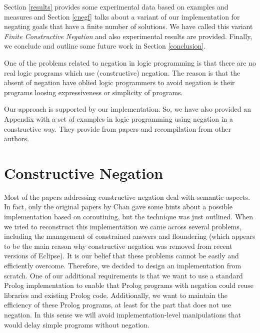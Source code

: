 \documentclass{tlp}
\begin{document}
Section \ref{results} provides some experimental data based on examples and
measures and Section \ref{cnegf} talks about a variant of our implementation
for negating goals that have a finite number of solutions. We have called this
variant \emph{Finite Constructive Negation} and also experimental results are
provided. Finally, we conclude and outline some future work in Section
\ref{conclusion}.
 
One of the problems related to negation in logic programming is that there are
no real logic programs which use (constructive) negation. The reason is that
the absent of negation have oblied logic programmers to avoid negation is
their programs loosing expressiveness or simplicity of programs.

Our approach is supported by our implementation. So, we have also
provided an Appendix with a set of examples in logic programming using
negation in a constructive way. They provide from papers and
recompilation from other authors.


\section{Constructive Negation}
\label{constructive}

Most of the papers addressing constructive negation deal with semantic
aspects. In fact, only the original papers by Chan gave some hints
about a possible implementation based on coroutining, but the
technique was just outlined. When we tried to reconstruct this
implementation we came across several problems, including the
management of constrained answers and floundering (which appears to be
the main reason why constructive negation was removed from recent
versions of Eclipse). It is our belief that these problems cannot be
easily and efficiently overcome. Therefore, we decided to design an
implementation from scratch.  One of our additional requirements is
that we want to use a standard Prolog implementation to enable that
Prolog programs with negation could reuse libraries and existing
Prolog code. Additionally, we want to maintain the efficiency of these
Prolog programs, at least for the part that does not use negation.  In
this sense we will avoid implementation-level manipulations that would
delay simple programs without negation.
\end{document}
